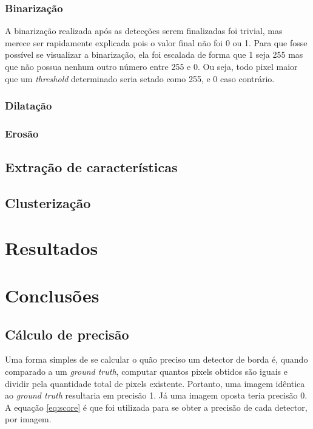 \documentclass[10pt,twocolumn,letterpaper]{article}
\begin{document}
\subsubsection{Binarização}

	A binarização realizada após as detecções serem finalizadas foi trivial, mas merece
ser rapidamente explicada pois o valor final não foi 0 ou 1. Para que fosse possível se
visualizar a binarização, ela foi escalada de forma que 1 seja 255 mas que não possua
nenhum outro número entre 255 e 0. Ou seja, todo pixel maior que um \emph{threshold}
determinado seria setado como 255, e 0 caso contrário.

\subsubsection{Dilatação}

\subsubsection{Erosão}

\subsection{Extração de características}

\subsection{Clusterização}

\section{Resultados}

\section{Conclusões}





\subsection{Cálculo de precisão}
Uma forma simples de se calcular o quão preciso um detector de borda é, quando comparado a um \emph{ground truth}, computar quantos pixels obtidos são iguais e dividir pela quantidade total de pixels existente. Portanto, uma imagem idêntica ao \emph{ground truth} resultaria em precisão 1. Já uma imagem oposta teria precisão 0. A equação \ref{eq:score} é que foi utilizada para se obter a precisão de cada detector, por imagem.
\end{document}
